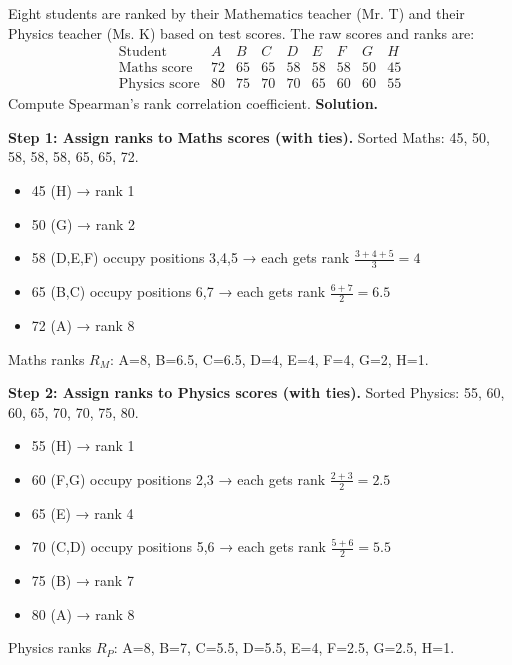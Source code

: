 \documentclass[11pt]{article}
\begin{document}
\begin{exoresolu}
Eight students are ranked by their Mathematics teacher (Mr. T) and their Physics teacher (Ms. K) based on test scores. The raw scores and ranks are:
\[
\begin{array}{c|cccccccc}
\text{Student} & A & B & C & D & E & F & G & H \\ \hline
\text{Maths score} & 72 & 65 & 65 & 58 & 58 & 58 & 50 & 45 \\
\text{Physics score} & 80 & 75 & 70 & 70 & 65 & 60 & 60 & 55
\end{array}
\]
Compute Spearman's rank correlation coefficient.
\tcblower
\textbf{Solution.}

\noindent\textbf{Step 1: Assign ranks to Maths scores (with ties).}
Sorted Maths: 45, 50, 58, 58, 58, 65, 65, 72.
\begin{itemize}
\item 45 (H) → rank 1
\item 50 (G) → rank 2
\item 58 (D,E,F) occupy positions 3,4,5 → each gets rank \(\frac{3+4+5}{3}=4\)
\item 65 (B,C) occupy positions 6,7 → each gets rank \(\frac{6+7}{2}=6.5\)
\item 72 (A) → rank 8
\end{itemize}
Maths ranks \(R_M\): A=8, B=6.5, C=6.5, D=4, E=4, F=4, G=2, H=1.

\noindent\textbf{Step 2: Assign ranks to Physics scores (with ties).}
Sorted Physics: 55, 60, 60, 65, 70, 70, 75, 80.
\begin{itemize}
\item 55 (H) → rank 1
\item 60 (F,G) occupy positions 2,3 → each gets rank \(\frac{2+3}{2}=2.5\)
\item 65 (E) → rank 4
\item 70 (C,D) occupy positions 5,6 → each gets rank \(\frac{5+6}{2}=5.5\)
\item 75 (B) → rank 7
\item 80 (A) → rank 8
\end{itemize}
Physics ranks \(R_P\): A=8, B=7, C=5.5, D=5.5, E=4, F=2.5, G=2.5, H=1.


\end{exoresolu}
\end{document}
